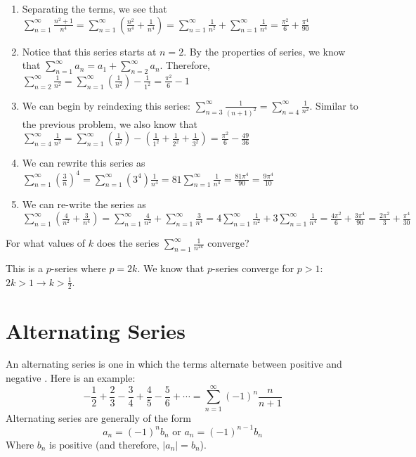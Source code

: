 \begin{Answer}[ref = euler1_series]
\begin{enumerate}
\item Separating the terms, we see that $\sum_{n=1}^\infty \frac{n^2 + 1}{n^4} 
= \sum_{n=1}^\infty \left( \frac{n^2}{n^4} + \frac{1}{n^4} \right) = \sum_{n=1}
^\infty \frac{1}{n^2} + \sum_{n=1}^\infty \frac{1}{n^4} = \frac{\pi^2}{6} + 
\frac{\pi^4}{90}$
\item Notice that this series starts at $n = 2$. By the properties of series, 
we know that $\sum_{n=1}^\infty a_n = a_1 + \sum_{n=2}^\infty a_n$. Therefore, 
$\sum_{n=2}^\infty \frac{1}{n^2} = \sum_{n=1}^\infty \left( \frac{1}{n^2} 
\right) - \frac{1}{1^2} = \frac{\pi^2}{6} - 1$
\item We can begin by reindexing this series: $\sum_{n=3}^\infty \frac{1}{(n + 
1)^2} = \sum_{n=4}^\infty \frac{1}{n^2}$. Similar to the previous problem, we 
also know that $\sum_{n=4}^\infty \frac{1}{n^2} = \sum_{n=1}^\infty \left( 
\frac{1}{n^2} \right) - \left( \frac{1}{1^2} + \frac{1}{2^2} + \frac{1}{3^2} 
\right) = \frac{\pi^2}{6} - \frac{49}{36}$
\item We can rewrite this series as $\sum_{n=1}^\infty \left( \frac{3}{n} 
\right)^4 = \sum_{n=1}^\infty (3^4)\frac{1}{n^4} = 81 \sum_{n=1}^\infty 
\frac{1}{n^4} = \frac{81\pi^4}{90} = \frac{9\pi^4}{10}$
\item We can re-write the series as $\sum_{n=1}^\infty \left( \frac{4}{n^2} + 
\frac{3}{n^4} \right) = \sum_{n=1}^\infty \frac{4}{n^2} + \sum_{n=1}^\infty 
\frac{3}{n^4} = 4 \sum_{n=1}^\infty \frac{1}{n^2} + 3 \sum_{n=1}^\infty 
\frac{1}{n^4} = \frac{4\pi^2}{6} + \frac{3\pi^4}{90} = \frac{2\pi^2}{3} + 
\frac{\pi^4}{30}$
\end{enumerate}
\end{Answer}

\begin{Exercise}[label = pseries1]
For what values of $k$ does the series $\sum_{n = 1}^\infty \frac{1}{n^{2k}}$ 
converge?
\end{Exercise}

\begin{Answer}[ref = pseries1]
This is a $p$-series where $p = 2k$. We know that $p$-series converge for $p > 
1$: $2k > 1 \rightarrow k > \frac{1}{2}$. 
\end{Answer}

\section{Alternating Series}
An alternating series is one in which the terms alternate between positive and 
negative . Here is an example:
$$-\frac{1}{2} + \frac{2}{3} - \frac{3}{4} + \frac{4}{5} - \frac{5}{6} + 
\cdots = \sum_{n=1}^\infty (-1)^n \frac{n}{n + 1}$$
Alternating series are generally of the form
$$a_n = (-1)^n b_n \text{ or } a_n = (-1)^{n - 1} b_n$$
Where $b_n$ is positive (and therefore, $|a_n| = b_n$).

